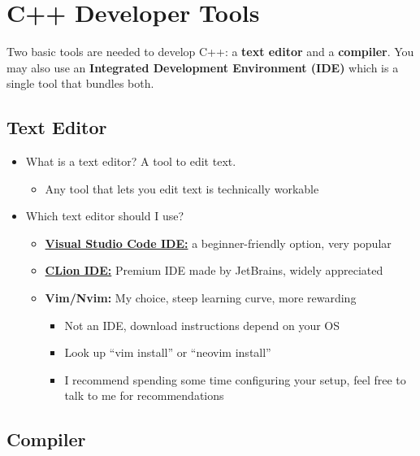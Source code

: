 \documentclass{article}
\begin{document}
\section{C++ Developer Tools}

\noindent
Two basic tools are needed to develop C++: a \textbf{text editor} and a \textbf{compiler}. You may also use an \textbf{Integrated Development Environment (IDE)} which is a single tool that bundles both.

\subsection{Text Editor}

\begin{itemize}
	\item What is a text editor? A tool to edit text.
	\begin{itemize}
		\item Any tool that lets you edit text is technically workable
	\end{itemize}
	\item Which text editor should I use? \begin{itemize}
		\item \href{https://code.visualstudio.com}{\textbf{Visual Studio Code IDE:}} a beginner-friendly option, very popular
		\item \href{https://www.jetbrains.com/clion/}{\textbf{CLion IDE:}} Premium IDE made by JetBrains, widely appreciated
		\item \textbf{Vim/Nvim:} My choice, steep learning curve, more rewarding \begin{itemize}
			\item Not an IDE, download instructions depend on your OS
			\item Look up ``vim install'' or ``neovim install''
			\item I recommend spending some time configuring your setup, feel free to talk to me for recommendations
		\end{itemize}
	\end{itemize}
\end{itemize}

\subsection{Compiler}
\end{document}
